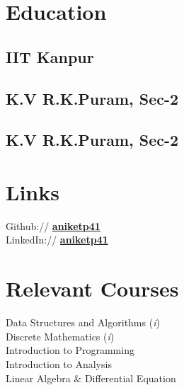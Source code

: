 \documentclass[]{deedy-resume-openfont}
\begin{document}
\begin{minipage}[t]{0.33\textwidth} 


\section{Education} 

\subsection{IIT Kanpur}
\sectionsep{}

\subsection{K.V R.K.Puram, Sec-2}
\sectionsep{}

\subsection{K.V R.K.Puram, Sec-2}


\section{Links} 
Github:// \href{https://github.com/aniketp41}{\bf aniketp41} \\
LinkedIn://  \href{https://www.linkedin.com/in/aniketp41}{\bf aniketp41} \\



\section{Relevant Courses}
Data Structures and Algorithms (\textit{i}) \\
Discrete Mathematics (\textit{i}) \\
Introduction to Programming \\
Introduction to Analysis \\
Linear Algebra \& Differential Equation \\


\end{minipage}
\end{document}
